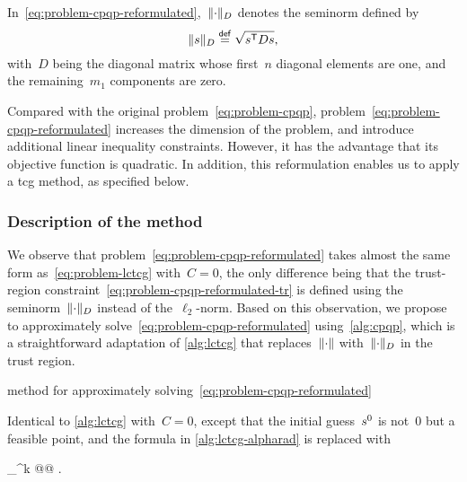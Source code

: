 In~\cref{eq:problem-cpqp-reformulated},~$\lVert\cdot\rVert_D$ denotes the seminorm defined by
\begin{equation*}
    \norm{\sstep}_D \eqdef \sqrt{\sstep^{\T} D \sstep},
\end{equation*}
with~$D$ being the diagonal matrix whose first~$n$ diagonal elements are one, and the remaining~$m_1$ components are zero.

Compared with the original problem~\cref{eq:problem-cpqp}, problem~\cref{eq:problem-cpqp-reformulated} increases the dimension of the problem, and introduce additional linear inequality constraints.
However, it has the advantage that its objective function is quadratic.
In addition, this reformulation enables us to apply a \gls{tcg} method, as specified below.

\subsubsection{Description of the  method}

We observe that problem~\cref{eq:problem-cpqp-reformulated} takes almost the same form as~\cref{eq:problem-lctcg} with~$C = 0$, the only difference being that the trust-region constraint~\cref{eq:problem-cpqp-reformulated-tr} is defined using the seminorm~$\lVert\cdot\rVert_D$ instead of the~$\ell_2$-norm.
Based on this observation, we propose to approximately solve~\cref{eq:problem-cpqp-reformulated} using~\cref{alg:cpqp}, which is a straightforward adaptation of \cref{alg:lctcg} that replaces~$\lVert\cdot\rVert$ with~$\lVert\cdot\rVert_D$ in the trust region.

\begin{algorithm}
    \caption{ method for approximately solving~\cref{eq:problem-cpqp-reformulated}}
    \label{alg:cpqp}
    \DontPrintSemicolon
    \onehalfspacing
    \nonl Identical to \cref{alg:lctcg} with~$C = 0$, except that the initial guess~$\sstep[0]$ is not~$0$ but\;
    \nonl a feasible point, and the formula in \cref{alg:lctcg-alpharad} is replaced with
    \begin{algomathdisplay}
        \alpha_{\rad}^k \gets \argmax @@ .
    \end{algomathdisplay}
\end{algorithm}


